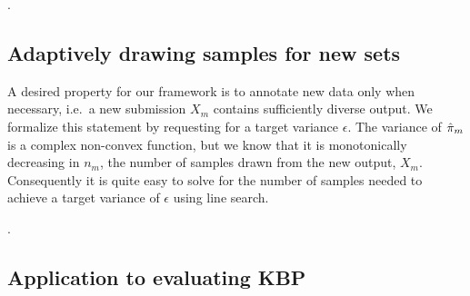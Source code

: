 .

\subsection{Adaptively drawing samples for new sets}
A desired property for our framework is to annotate new data only when necessary, i.e.\ a new submission $X_m$ contains sufficiently diverse output.
We formalize this statement by requesting for a target variance $\epsilon$.
The variance of ${\hat{\pi}}_m$ is a complex non-convex function, but we know that it is monotonically decreasing in $n_m$, the number of samples drawn from the new output, $X_m$.
Consequently it is quite easy to solve for the number of samples needed to achieve a target variance of $\epsilon$ using line search.

.

\subsection{Application to evaluating KBP}




